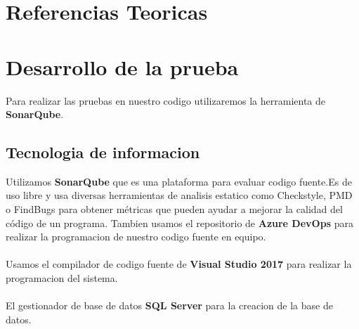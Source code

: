 \documentclass[12pt,letterpaper]{article}
\begin{document}
\section{Referencias Teoricas}

\section{Desarrollo de la prueba}
Para realizar las pruebas en nuestro codigo utilizaremos la herramienta
de \textbf{SonarQube}.
    \subsection{Tecnologia de informacion}

    Utilizamos \textbf{SonarQube} que es una plataforma para evaluar 
    codigo fuente.Es de uso libre y usa diversas herramientas de analisis estatico
     como Checkstyle, PMD o FindBugs para obtener métricas que pueden ayudar a mejorar 
     la calidad del código de un programa.
    \newpage
     Tambien usamos el repositorio de \textbf{Azure DevOps} para realizar la
     programacion de nuestro codigo fuente en equipo.
     \\
     \\Usamos el compilador de codigo fuente de \textbf{Visual Studio 2017} para realizar la 
     programacion del sistema.
     \\
     \\El gestionador de base de datos \textbf{SQL Server} para la creacion de la base de datos.
\end{document}
